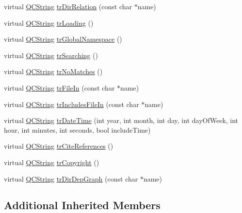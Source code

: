 \begin{DoxyCompactItemize}
virtual \hyperlink{class_q_c_string}{Q\-C\-String} \hyperlink{class_translator_catalan_a38a56cc8bcc5323be9d1f09b0daa5933}{tr\-Dir\-Relation} (const char $\ast$name)
\item 
virtual \hyperlink{class_q_c_string}{Q\-C\-String} \hyperlink{class_translator_catalan_aca8cf7409bceb9f8e6af47f637da5457}{tr\-Loading} ()
\item 
virtual \hyperlink{class_q_c_string}{Q\-C\-String} \hyperlink{class_translator_catalan_aa9fd39641e570165be20c71c67481fee}{tr\-Global\-Namespace} ()
\item 
virtual \hyperlink{class_q_c_string}{Q\-C\-String} \hyperlink{class_translator_catalan_aea79f5912e787bbb2c441223ccd382c6}{tr\-Searching} ()
\item 
virtual \hyperlink{class_q_c_string}{Q\-C\-String} \hyperlink{class_translator_catalan_a240e49b617153456e0f29bef561cc10f}{tr\-No\-Matches} ()
\item 
virtual \hyperlink{class_q_c_string}{Q\-C\-String} \hyperlink{class_translator_catalan_acf964d17bad4c55c393193fe9708575f}{tr\-File\-In} (const char $\ast$name)
\item 
virtual \hyperlink{class_q_c_string}{Q\-C\-String} \hyperlink{class_translator_catalan_a53f57c6e2aa0b9dc09bc47b3746d3481}{tr\-Includes\-File\-In} (const char $\ast$name)
\item 
virtual \hyperlink{class_q_c_string}{Q\-C\-String} \hyperlink{class_translator_catalan_a19c43671f677ae0445fca1fe7a5f62cc}{tr\-Date\-Time} (int year, int month, int day, int day\-Of\-Week, int hour, int minutes, int seconds, bool include\-Time)
\item 
virtual \hyperlink{class_q_c_string}{Q\-C\-String} \hyperlink{class_translator_catalan_ae43b2c6dbb1637144e32cd13a0d4704c}{tr\-Cite\-References} ()
\item 
virtual \hyperlink{class_q_c_string}{Q\-C\-String} \hyperlink{class_translator_catalan_a840474c30dfc2d4e92d1a29c5d1bf343}{tr\-Copyright} ()
\item 
virtual \hyperlink{class_q_c_string}{Q\-C\-String} \hyperlink{class_translator_catalan_abbe522be6eed72f54409458a1896323c}{tr\-Dir\-Dep\-Graph} (const char $\ast$name)
\end{DoxyCompactItemize}
\subsection*{Additional Inherited Members}


